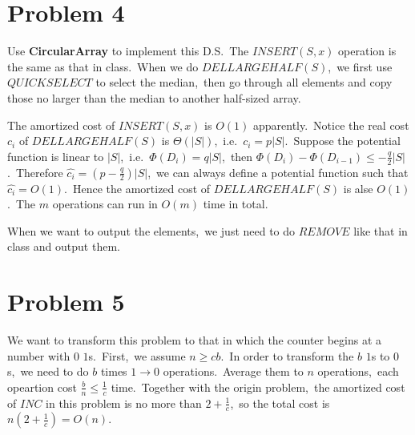 \documentclass[]{article}
\begin{document}
    \section{Problem 4}
    Use \textbf{CircularArray} to implement this D.S.\ The $INSERT(S,x)$ operation is the same as that in class.\ When we do $DELLARGEHALF(S)$,\ we first use $QUICKSELECT$ to select the median,\ then go through all elements and copy those no larger than the median to another half-sized array.
    
    The amortized cost of $INSERT(S,x)$ is $O(1)$ apparently.\ Notice the real cost $c_i$ of $DELLARGEHALF(S)$ is $\Theta(|S|)$,\ i.e.\ $c_i = p|S|$.\ Suppose the potential function is linear to $|S|$,\ i.e.\ $\Phi(D_i) = q|S|$,\ then $\Phi(D_i) - \Phi(D_{i-1}) \leq -\frac{q}{2}|S|$.\ Therefore $\hat{c_i} = (p-\frac{q}{2})|S|$,\ we can always define a potential function such that $\hat{c_i} = O(1)$.\ Hence the amortized cost of $DELLARGEHALF(S)$ is alse $O(1)$.\ The $m$ operations can run in $O(m)$ time in total.
    
    When we want to output the elements,\ we just need to do $REMOVE$ like that in class and output them.  
    
    \section{Problem 5}
    We want to transform this problem to that in which the counter begins at a number with $0$ $1$s.\ First,\ we assume $n \geq cb$.\ In order to transform the $b$ $1$s to $0$s,\ we need to do $b$ times $1\to 0$ operations.\ Average them to $n$ operations,\ each opeartion cost $\frac{b}{n}\leq \frac{1}{c}$ time.\ Together with the origin problem,\ the amortized cost of $INC$ in this problem is no more than $2+\frac{1}{c}$,\ so the total cost is $n(2+\frac{1}{c}) = O(n)$.
\end{document}
